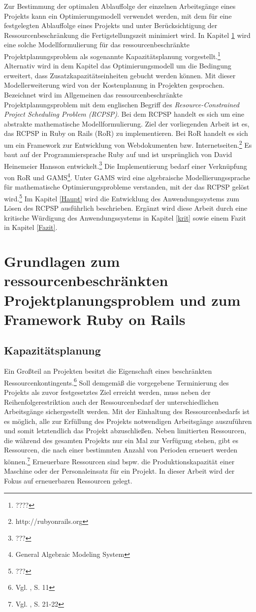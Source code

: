 \documentclass[a4paper,12pt,parskip,bibtotoc,liststotoc]{article}
\begin{document}
Zur Bestimmung der optimalen Ablauffolge der einzelnen Arbeitsgänge eines Projekts kann ein Optimierungsmodell verwendet werden, mit dem für eine festgelegten Ablauffolge eines Projekts und unter Berücksichtigung der Ressourcenbeschränkung die Fertigstellungszeit minimiert wird. In Kapitel \ref{Grund} wird eine solche Modellformulierung für das ressourcenbeschränkte Projektplanungsproblem als sogenannte Kapazitätsplanung vorgestellt.\footnote{????} Alternativ wird in dem Kapitel das Optimierungsmodell um die Bedingung erweitert, dass  Zusatzkapazitätseinheiten gebucht werden können. Mit dieser Modellerweiterung wird von der Kostenplanung in Projekten gesprochen. Bezeichnet wird im Allgemeinen das ressourcenbeschränkte Projektplanungsproblem mit dem englischen Begriff des \textit{Resource-Con\-strained Project Scheduling Problem (RCPSP)}. Bei dem RCPSP handelt es sich um eine abstrakte mathematische Modellformulierung. Ziel der vorliegenden Arbeit ist es, das RCPSP in Ruby on Rails (RoR) zu implementieren. Bei RoR handelt es sich um ein Framework zur Entwicklung von Webdokumenten bzw. Internetseiten.\footnote{http://rubyonrails.org} Es baut auf der Programmiersprache Ruby auf und ist ursprünglich von David Heinemeier Hansson entwickelt.\footnote{???} Die Implementierung bedarf einer Verknüpfung von RoR und GAMS\footnote{General Algebraic Modeling System}. Unter GAMS wird eine algebraische Modellierungssprache für mathematische Optimierungsprobleme verstanden, mit der das RCPSP gelöst wird.\footnote{???} Im Kapitel \ref{Haupt} wird die Entwicklung des Anwendungssystems zum Lösen des RCPSP ausführlich beschrieben. Ergänzt wird diese Arbeit durch eine kritische Würdigung des Anwendungssystems in Kapitel \ref{krit} sowie einem Fazit in Kapitel \ref{Fazit}.

\section{Grundlagen zum ressourcenbeschränkten Projektplanungsproblem und zum Framework Ruby on Rails} \label{Grund}
\subsection{Kapazitätsplanung}
Ein Großteil an Projekten besitzt die Eigenschaft eines beschränkten Ressourcenkontingents.\footnote{Vgl. \cite{kellenbrink2014einfuhrung}, S. 11} Soll demgemäß die vorgegebene Terminierung des Projekts als zuvor festgesetztes Ziel erreicht werden, muss neben der Reihenfolgerestriktion auch der Ressourcenbedarf der unterschiedlichen Arbeitsgänge sichergestellt werden. Mit der Einhaltung des Ressourcenbedarfs ist es möglich, alle zur Erfüllung des Projekts notwendigen Arbeitsgänge auszuführen und somit letztendlich das Projekt abzuschließen. Neben limitierten Ressourcen, die während des gesamten Projekts nur ein Mal zur Verfügung stehen, gibt es Ressourcen, die nach einer bestimmten Anzahl von Perioden erneuert werden können.\footnote{Vgl. \cite{neumann2003project}, S. 21-22} Erneuerbare Ressourcen sind bspw. die Produktionskapazität einer Maschine oder der Personaleinsatz für ein Projekt. In dieser Arbeit wird der Fokus auf erneuerbaren Ressourcen gelegt.\\
\end{document}
